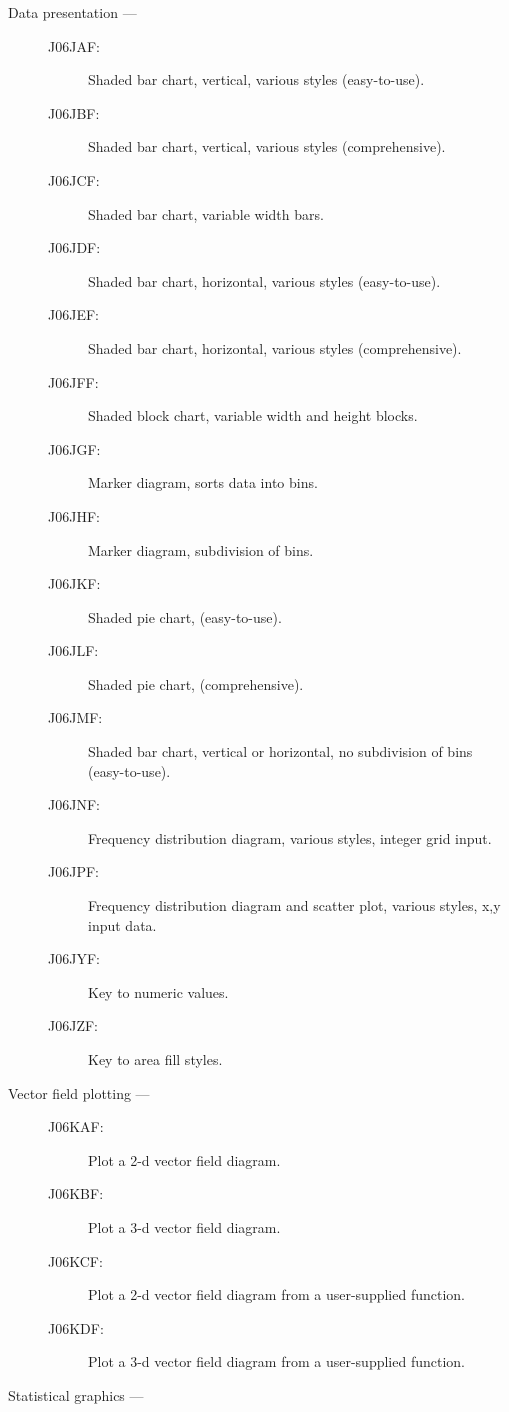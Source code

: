 \begin{description}
\item [Data presentation ---]

\begin{description}
\item [J06JAF:]  Shaded bar chart, vertical, various styles (easy-to-use).
\item [J06JBF:]  Shaded bar chart, vertical, various styles (comprehensive).
\item [J06JCF:]  Shaded bar chart, variable width bars.
\item [J06JDF:]  Shaded bar chart, horizontal, various styles (easy-to-use).
\item [J06JEF:]  Shaded bar chart, horizontal, various styles (comprehensive).
\item [J06JFF:]  Shaded block chart, variable width and height blocks.
\item [J06JGF:]  Marker diagram, sorts data into bins.
\item [J06JHF:]  Marker diagram, subdivision of bins.
\item [J06JKF:]  Shaded pie chart, (easy-to-use).
\item [J06JLF:]  Shaded pie chart, (comprehensive).
\item [J06JMF:]  Shaded bar chart, vertical or horizontal, no subdivision of bins (easy-to-use).
\item [J06JNF:]  Frequency distribution diagram, various styles, integer grid input.
\item [J06JPF:]  Frequency distribution diagram and scatter plot, various styles, x,y input data.
\item [J06JYF:]  Key to numeric values.
\item [J06JZF:]  Key to area fill styles.
\end{description}

\item [Vector field plotting ---]

\begin{description}
\item [J06KAF:]  Plot a 2-d vector field diagram.
\item [J06KBF:]  Plot a 3-d vector field diagram.
\item [J06KCF:]  Plot a 2-d vector field diagram from a user-supplied function.
\item [J06KDF:]  Plot a 3-d vector field diagram from a user-supplied function.
\end{description}

\item [Statistical graphics ---]


\end{description}
